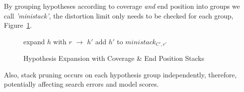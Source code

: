 \documentclass[]{article}
\begin{document}
By grouping hypotheses according to coverage \emph{and} end position into groups we call \emph{'ministack'}, the distortion limit only needs to be checked for each group, Figure~\ref{algo:Hypothesis Expansion with Sorted Stack}. 
\begin{figure} [h]
\begin{algorithmic}
	\STATE expand $h$ with $r$ $\rightarrow$ $h'$
	\STATE add $h'$ to $ministack_{C',e'}$
      \ENDFOR
    \ENDIF
  \ENDFOR %
\ENDFOR %
\end{algorithmic}
\caption{Hypothesis Expansion with Coverage \& End Position Stacks}
\label{algo:Hypothesis Expansion with Sorted Stack}
\end{figure}

Also, stack pruning occurs on each hypothesis group independently, therefore, potentially affecting search errors and model scores. 
\end{document}
